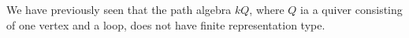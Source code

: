 We have previously seen that the path algebra $kQ$,  where $Q$ ia a quiver
consisting of one vertex and a loop, does not have finite representation type.
